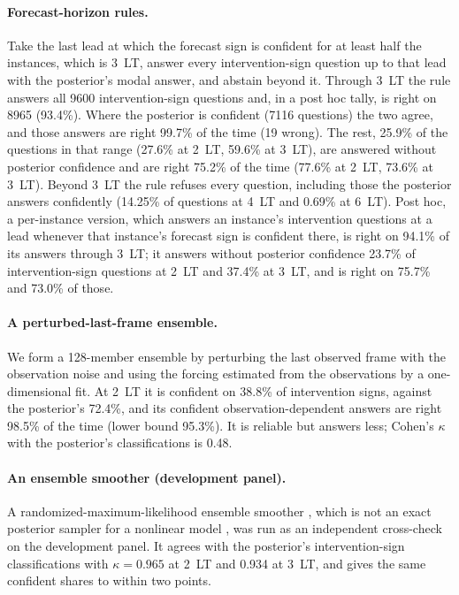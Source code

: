 \documentclass[11pt]{article}
\begin{document}
\paragraph{Forecast-horizon rules.} Take the last lead at which the forecast sign is confident for at least half the instances, which is 3~LT, answer every intervention-sign question up to that lead with the posterior's modal answer, and abstain beyond it. Through 3~LT the rule answers all 9600 intervention-sign questions and, in a post hoc tally, is right on 8965 (93.4\%). Where the posterior is confident (7116 questions) the two agree, and those answers are right 99.7\% of the time (19 wrong). The rest, 25.9\% of the questions in that range (27.6\% at 2~LT, 59.6\% at 3~LT), are answered without posterior confidence and are right 75.2\% of the time (77.6\% at 2~LT, 73.6\% at 3~LT). Beyond 3~LT the rule refuses every question, including those the posterior answers confidently (14.25\% of questions at 4~LT and 0.69\% at 6~LT). Post hoc, a per-instance version, which answers an instance's intervention questions at a lead whenever that instance's forecast sign is confident there, is right on 94.1\% of its answers through 3~LT; it answers without posterior confidence 23.7\% of intervention-sign questions at 2~LT and 37.4\% at 3~LT, and is right on 75.7\% and 73.0\% of those.

\paragraph{A perturbed-last-frame ensemble.} We form a 128-member ensemble by perturbing the last observed frame with the observation noise and using the forcing estimated from the observations by a one-dimensional fit. At 2~LT it is confident on 38.8\% of intervention signs, against the posterior's 72.4\%, and its confident observation-dependent answers are right 98.5\% of the time (lower bound 95.3\%). It is reliable but answers less; Cohen's $\kappa$ with the posterior's classifications is 0.48.

\paragraph{An ensemble smoother (development panel).} A randomized-maximum-likelihood ensemble smoother \citep{kitanidis1995quasilinear,oliver1996conditioning}, which is not an exact posterior sampler for a nonlinear model \citep{ba2022randomized}, was run as an independent cross-check on the development panel. It agrees with the posterior's intervention-sign classifications with $\kappa = 0.965$ at 2~LT and 0.934 at 3~LT, and gives the same confident shares to within two points.
\end{document}
